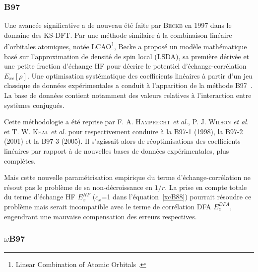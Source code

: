 \documentclass[12pt,a4paper]{book}
\begin{document}
	
	\subsubsection{B97}
	
	Une avancée significative a de nouveau été faite par \textsc{Becke} en 1997 dans le domaine des KS-DFT. Par une méthode similaire à la combinaison linéaire d'orbitales atomiques, notée LCAO\footnote{\og Linear Combination of Atomic Orbitals \fg{}.}, Becke a proposé un modèle mathématique basé sur l'approximation de densité de spin local (LSDA), sa première dérivée et une petite fraction d'échange HF pour décrire le potentiel d'échange-corrélation $E_{xc}[\rho]$. Une optimisation systématique des coefficients linéaires à partir d'un jeu classique de données expérimentales a conduit à l'apparition de la méthode B97~\cite{becke1997density}. La base de données contient notamment des valeurs relatives à l'interaction entre systèmes conjugués.
	
	Cette méthodologie a été reprise par F. A. \textsc{Hamprecht} \textit{et al.}, P. J. \textsc{Wilson} \textit{et al.} et T. W. \textsc{Keal} \textit{et al.} pour respectivement conduire à la B97-1 \cite{hamprecht1998development} (1998), la B97-2 \cite{wilson2001hybrid} (2001) et la B97-3 \cite{keal2005semiempirical} (2005). Il s'agissait alors de réoptimisations des coefficients linéaires par rapport à de nouvelles bases de données expérimentales, plus complètes.
	
	Mais cette nouvelle paramétrisation empirique du terme d'échange-corrélation ne résout pas le problème de sa non-décroissance en $1/r$. La prise en compte totale du terme d'échange HF $E_{x}^{HF}$ ($c_{x}$=1 dans l'équation~\ref{xcB88}) pourrait résoudre ce problème mais serait incompatible avec le terme de corrélation DFA $E_{c}^{DFA}$, engendrant une mauvaise compensation des erreurs respectives.
	
	\subsubsection{$\omega$B97}
	
\end{document}
